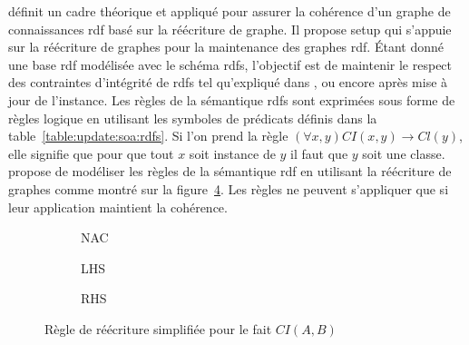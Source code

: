 \cite{chabinUsingGraphGrammar2019} définit un cadre théorique et appliqué pour assurer la cohérence d'un graphe de connaissances \gls{rdf} basé sur la réécriture de graphe.
Il propose \gls{setup} qui s'appuie sur la réécriture de graphes pour la maintenance des graphes \gls{rdf}.
Étant donné une base \gls{rdf} modélisée avec le schéma \gls{rdfs}, l'objectif est de maintenir le respect des contraintes d'intégrité de \gls{rdfs} tel qu'expliqué dans \cite{flourisFormalFoundationsRDF2013}, \cite{halfeld-ferrariRDFUpdatesConstraints2017} ou encore \cite{chabinConsistentUpdatingDatabases2020} après mise à jour de l'instance.
Les règles de la sémantique \gls{rdfs} sont exprimées sous forme de règles logique en utilisant les symboles de prédicats définis dans la table~\ref{table:update:soa:rdfs}.
Si l'on prend la règle $(\forall x,y) CI(x,y) \to Cl(y)$, elle signifie que pour que tout $x$ soit instance de $y$ il faut que $y$ soit une classe.
\cite{chabinUsingGraphGrammar2019} propose de modéliser les règles de la sémantique \gls{rdf} en utilisant la réécriture de graphes comme montré sur la figure~\ref{fig:gram_rule}.
Les règles ne peuvent s'appliquer que si leur application maintient la cohérence.

\begin{figure}[ht]
    \centering
    \begin{subfigure}[b]{.3\textwidth}
        \centering
        \caption{NAC}
        \label{fig:gram_rule:nac}
    \end{subfigure}
    \begin{subfigure}[b]{.3\textwidth}
        \centering
        \caption{LHS}
        \label{fig:gram_rule:lhs}
    \end{subfigure}
    \begin{subfigure}[b]{.3\textwidth}
        \centering
        \caption{RHS}
        \label{fig:gram_rule:rhs}
    \end{subfigure}
    \caption{Règle de réécriture simplifiée pour le fait $CI(A,B)$}
    \label{fig:gram_rule}
\end{figure}

